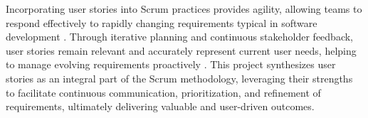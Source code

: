 Incorporating user stories into Scrum practices provides agility, allowing teams to respond effectively to rapidly changing requirements typical in software development \cite{cao2008agile}. Through iterative planning and continuous stakeholder feedback, user stories remain relevant and accurately represent current user needs, helping to manage evolving requirements proactively \cite{cao2008agile}. This project synthesizes user stories as an integral part of the Scrum methodology, leveraging their strengths to facilitate continuous communication, prioritization, and refinement of requirements, ultimately delivering valuable and user-driven outcomes.
